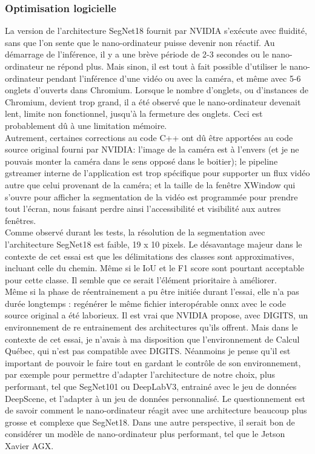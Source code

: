 \subsubsection{Optimisation logicielle}
\noindent La version de l'architecture SegNet18 fournit par NVIDIA s'exécute avec fluidité, sans que l'on sente que le nano-ordinateur puisse devenir non réactif. Au démarrage de l'inférence, il y a une brève période de 2-3 secondes ou le nano-ordinateur ne répond plus. Mais sinon, il est tout à fait possible d'utiliser le nano-ordinateur pendant l'inférence d'une vidéo ou avec la caméra, et même avec 5-6 onglets d'ouverts dans Chromium. Lorsque le nombre d'onglets, ou d'instances de Chromium, devient trop grand, il a été observé que le nano-ordinateur devenait lent, limite non fonctionnel, jusqu'à la fermeture des onglets. Ceci est probablement dû à une limitation mémoire.
\vspace{0.5\baselineskip}
\\
\noindent Autrement, certaines corrections au code C++ ont dû être apportées au code source original fourni par NVIDIA: l'image de la caméra est à l'envers (et je ne pouvais monter la caméra dans le sens opposé dans le boitier); le pipeline gstreamer interne de l'application est trop spécifique pour supporter un flux vidéo autre que celui provenant de la caméra; et la taille de la fenêtre XWindow qui s'ouvre pour afficher la segmentation de la vidéo est programmée pour prendre tout l'écran, nous faisant perdre ainsi l'accessibilité et visibilité aux autres fenêtres.
\vspace{0.5\baselineskip}
\\
\noindent Comme observé durant les tests, la résolution de la segmentation avec l'architecture SegNet18 est faible, 19 x 10 pixels. Le désavantage majeur dans le contexte de cet essai est que les délimitations des classes sont approximatives, incluant celle du chemin. Même si le IoU et le F1 score sont pourtant acceptable pour cette classe. Il semble que ce serait l'élément prioritaire à améliorer. 
\vspace{0.5\baselineskip}
\\
\noindent Même si la phase de réentrainement a pu être initiée durant l'essai, elle n'a pas durée longtemps : regénérer le même fichier interopérable \acrshort{onnx} avec le code source original a été laborieux. Il est vrai que NVIDIA propose, avec DIGITS, un environnement de re entrainement des architectures qu'ils offrent. Mais dans le contexte de cet essai, je n'avais à ma disposition que l'environnement de Calcul Québec, qui n'est pas compatible avec DIGITS. Néanmoins je pense qu'il est important de pouvoir le faire tout en gardant le contrôle de son environnement, par exemple pour permettre d'adapter l'architecture de notre choix, plus performant, tel que SegNet101 ou DeepLabV3, entrainé avec le jeu de données DeepScene, et l'adapter à un jeu de données personnalisé. Le questionnement est de savoir comment le nano-ordinateur réagit avec une architecture beaucoup plus grosse et complexe que SegNet18. Dans une autre perspective, il serait bon de considérer un modèle de nano-ordinateur plus performant, tel que le Jetson Xavier AGX.
